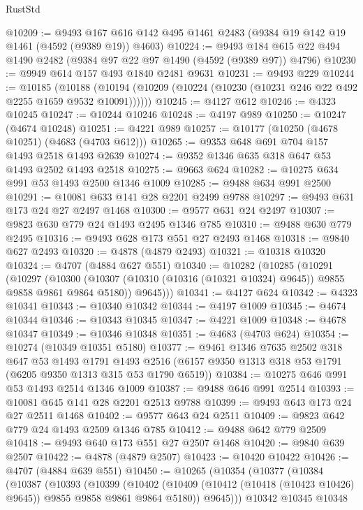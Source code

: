 \begin{lexlean}{RustStd}
\begin{coremodule}
@10209 := @9493 @167 @616 @142 @495 @1461 @2483 (@9384 @19 @142 @19 @1461 (@4592 (@9389 @19)) @4603)
@10224 := @9493 @184 @615 @22 @494 @1490 @2482 (@9384 @97 @22 @97 @1490 (@4592 (@9389 @97)) @4796)
@10230 := @9949 @614 @157 @493 @1840 @2481 @9631
@10231 := @9493 @229
@10244 := @10185
    (@10188 (@10194 (@10209 (@10224 (@10230 (@10231 @246 @22 @492 @2255 @1659 @9532 @10091))))))
@10245 := @4127 @612
@10246 := @4323 @10245
@10247 := @10244 @10246
@10248 := @4197 @989
@10250 := @10247 (@4674 @10248)
@10251 := @4221 @989
@10257 := @10177 (@10250 (@4678 @10251) (@4683 (@4703 @612)))
@10265 := @9353 @648 @691 @704 @157 @1493 @2518 @1493 @2639
@10274 := @9352 @1346 @635 @318 @647 @53 @1493 @2502 @1493 @2518
@10275 := @9663 @624
@10282 := @10275 @634 @991 @53 @1493 @2500 @1346 @1009
@10285 := @9488 @634 @991 @2500
@10291 := @10081 @633 @141 @28 @2201 @2499 @9788
@10297 := @9493 @631 @173 @24 @27 @2497 @1468
@10300 := @9577 @631 @24 @2497
@10307 := @9823 @630 @779 @24 @1493 @2495 @1346 @785
@10310 := @9488 @630 @779 @2495
@10316 := @9493 @628 @173 @551 @27 @2493 @1468
@10318 := @9840 @627 @2493
@10320 := @4878 (@4879 @2493)
@10321 := @10318 @10320
@10324 := @4707 (@4884 @627 @551)
@10340 := @10282
    (@10285
      (@10291
        (@10297
          (@10300 (@10307 (@10310 (@10316 (@10321 @10324) @9645)) @9855 @9858 @9861 @9864 @5180))
          @9645)))
@10341 := @4127 @624
@10342 := @4323 @10341
@10343 := @10340 @10342
@10344 := @4197 @1009
@10345 := @4674 @10344
@10346 := @10343 @10345
@10347 := @4221 @1009
@10348 := @4678 @10347
@10349 := @10346 @10348
@10351 := @4683 (@4703 @624)
@10354 := @10274 (@10349 @10351 @5180)
@10377 := @9461
    @1346
    @7635
    @2502
    @318
    @647
    @53
    @1493
    @1791
    @1493
    @2516
    (@6157 @9350 @1313 @318 @53 @1791 (@6205 @9350 @1313 @315 @53 @1790 @6519))
@10384 := @10275 @646 @991 @53 @1493 @2514 @1346 @1009
@10387 := @9488 @646 @991 @2514
@10393 := @10081 @645 @141 @28 @2201 @2513 @9788
@10399 := @9493 @643 @173 @24 @27 @2511 @1468
@10402 := @9577 @643 @24 @2511
@10409 := @9823 @642 @779 @24 @1493 @2509 @1346 @785
@10412 := @9488 @642 @779 @2509
@10418 := @9493 @640 @173 @551 @27 @2507 @1468
@10420 := @9840 @639 @2507
@10422 := @4878 (@4879 @2507)
@10423 := @10420 @10422
@10426 := @4707 (@4884 @639 @551)
@10450 := @10265
    (@10354
      (@10377
        (@10384
          (@10387
            (@10393
              (@10399
                (@10402
                  (@10409 (@10412 (@10418 (@10423 @10426) @9645)) @9855 @9858 @9861 @9864 @5180))
                @9645)))
          @10342
          @10345
          @10348

\end{coremodule}
\end{lexlean}
